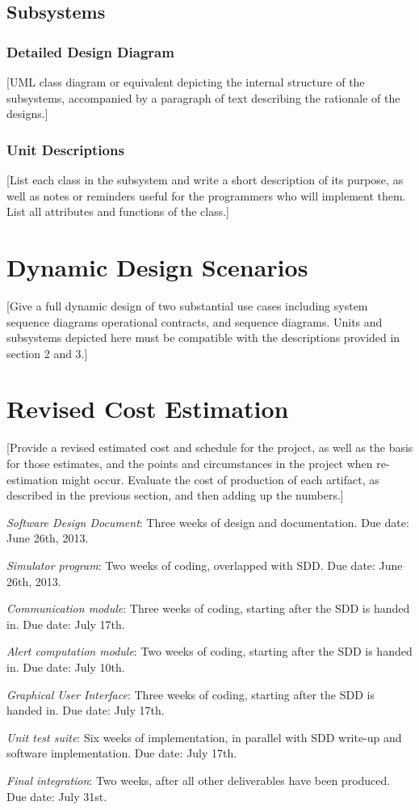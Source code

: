 \documentclass{article}
\begin{document}
\subsection{Subsystems} 

\subsubsection{Detailed Design Diagram}

[UML class diagram or equivalent depicting the internal structure of the subsystems, accompanied by a paragraph of text describing the rationale of the designs.]

\subsubsection{Unit Descriptions}

[List each class in the subsystem and write a short description of its purpose, as well as notes or reminders useful for the programmers who will implement them. List all attributes and functions of the class.]

\section{Dynamic Design Scenarios} %

[Give a full dynamic design of two substantial use cases including system sequence diagrams operational contracts, and sequence diagrams. Units and subsystems depicted here must be compatible with the descriptions provided in section 2 and 3.]

\section{Revised Cost Estimation} %

[Provide a revised estimated cost and schedule for the project, as well as the basis for those estimates, and the points and circumstances in the project when re-estimation might occur.
Evaluate the cost of production of each artifact, as described in the previous section, and then adding up the numbers.]

\emph{Software Design Document}: Three weeks of design and documentation. Due date: June 26th, 2013.

\emph{Simulator program}: Two weeks of coding, overlapped with SDD. Due date: June 26th, 2013.

\emph{Communication module}: Three weeks of coding, starting after the SDD is handed in. Due date: July 17th.

\emph{Alert computation module}: Two weeks of coding, starting after the SDD is handed in. Due date: July 10th.

\emph{Graphical User Interface}: Three weeks of coding, starting after the SDD is handed in. Due date: July 17th.

\emph{Unit test suite}: Six weeks of implementation, in parallel with SDD write-up and software implementation. Due date: July 17th.

\emph{Final integration}: Two weeks, after all other deliverables have been produced. Due date: July 31st.
\end{document}
